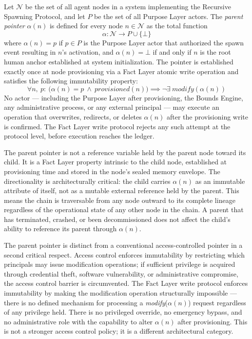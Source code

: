 \begin{dfn}
\label{dfn:parent-pointer}
Let $\mathcal{N}$ be the set of all agent nodes in a \bxthree{} system implementing the Recursive Spawning Protocol, and let $P$ be the set of all Purpose Layer actors. The \emph{parent pointer} $\alpha(n)$ is defined for every node $n \in \mathcal{N}$ as the total function
\begin{equation}
\alpha : \mathcal{N} \rightarrow P \cup \{\bot\}
\label{eq:alpha-function}
\end{equation}
where $\alpha(n) = p$ if $p \in P$ is the Purpose Layer actor that authorized the spawn event resulting in $n$'s activation, and $\alpha(n) = \bot$ if and only if $n$ is the root human anchor established at system initialization. The pointer is established exactly once at node provisioning via a Fact Layer atomic write operation and satisfies the following immutability property:
\begin{equation}
\forall n,\ p:\ \bigl(\alpha(n) = p \ \land \ \textit{provisioned}(n)\bigr) \implies \neg\exists\ \textit{modify}(\alpha(n))
\label{eq:parent-pointer-immutable}
\end{equation}
No actor --- including the Purpose Layer after provisioning, the Bounds Engine, any administrative process, or any external principal --- may execute an operation that overwrites, redirects, or deletes $\alpha(n)$ after the provisioning write is confirmed. The Fact Layer write protocol rejects any such attempt at the protocol level, before execution reaches the ledger.
\end{dfn}

The parent pointer is not a reference variable held by the parent node toward its child. It is a Fact Layer property intrinsic to the child node, established at provisioning time and stored in the node's sealed memory envelope. The directionality is architecturally critical: the child carries $\alpha(n)$ as an immutable attribute of itself, not as a mutable external reference held by the parent. This means the chain is traversable from any node outward to its complete lineage regardless of the operational state of any other node in the chain. A parent that has terminated, crashed, or been decommissioned does not affect the child's ability to reference its parent through $\alpha(n)$.

The parent pointer is distinct from a conventional access-controlled pointer in a second critical respect. Access control enforces immutability by restricting which principals may issue modification operations; if sufficient privilege is acquired through credential theft, software vulnerability, or administrative compromise, the access control barrier is circumvented. The Fact Layer write protocol enforces immutability by making the modification operation structurally impossible --- there is no defined mechanism for processing a \textit{modify}($\alpha(n)$) request regardless of any privilege held. There is no privileged override, no emergency bypass, and no administrative role with the capability to alter $\alpha(n)$ after provisioning. This is not a stronger access control policy; it is a different architectural category.

